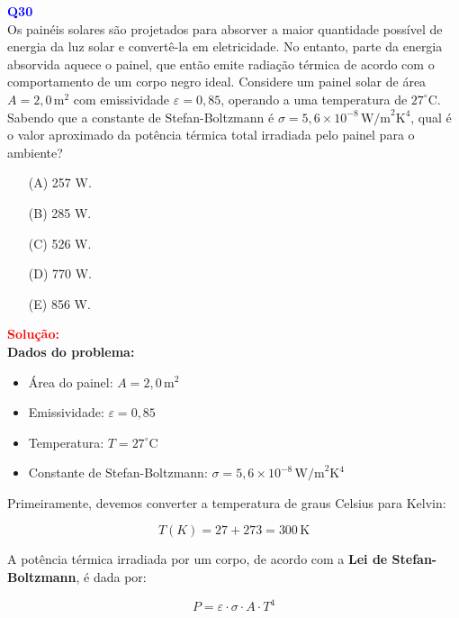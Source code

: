 \documentclass[a4paper,12pt]{article}
\begin{document}
\begin{flushleft}
\textbf{\textcolor{blue}{\Large Q30}}\\

Os painéis solares são projetados para absorver a maior quantidade possível de energia da luz solar e convertê-la em eletricidade. 
No entanto, parte da energia absorvida aquece o painel, que então emite radiação térmica de acordo com o comportamento de um corpo 
negro ideal. Considere um painel solar de área $A = 2,0 \, \text{m}^2$ com emissividade $\varepsilon = 0,85$, operando a uma 
temperatura de $27^\circ \text{C}$. Sabendo que a constante de Stefan-Boltzmann é $\sigma = 5,6 \times 10^{-8} \, \text{W/m}^2 \text{K}^4$, 
qual é o valor aproximado da potência térmica total irradiada pelo painel para o ambiente?


\begin{itemize}
\item[(A)] 257 W.
\item[(B)] 285 W. 
\item[(C)] 526 W.
\item[(D)] 770 W.
\item[(E)] 856 W.
\end{itemize}

\vspace{0.5cm}

\textcolor{red}{\textbf{Solução:}}\\

\textbf{Dados do problema:}

\begin{itemize}
    \item Área do painel: $A = 2,0 \, \text{m}^2$
    \item Emissividade: $\varepsilon = 0,85$
    \item Temperatura: $T = 27^\circ \text{C}$
    \item Constante de Stefan-Boltzmann: $\sigma = 5,6 \times 10^{-8} \, \text{W/m}^2\text{K}^4$
\end{itemize}

Primeiramente, devemos converter a temperatura de graus Celsius para Kelvin:

\[
T(K) = 27 + 273 = 300 \, \text{K}
\]

\bigskip

A potência térmica irradiada por um corpo, de acordo com a \textbf{Lei de Stefan-Boltzmann}, é dada por:

\[
\boxed{
P = \varepsilon \cdot \sigma \cdot A \cdot T^4
}
\]


\end{flushleft}
\end{document}
